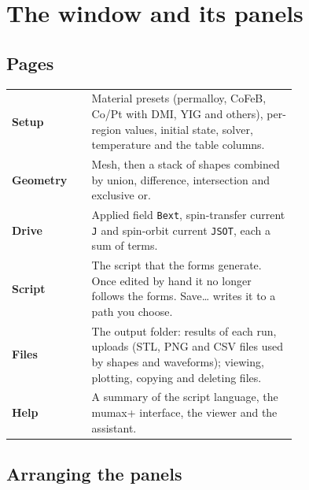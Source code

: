 \documentclass[11pt,a4paper,oneside]{book}
\newcommand{\code}[1]{\texttt{#1}}
\renewcommand{\_}{\textunderscore\allowbreak}
\newcommand{\menu}[1]{\textsf{#1}}
\begin{document}
\chapter{The window and its panels}\label{ch:ui}

\section{Pages}

\begin{center}
\begin{tabular}{>{\bfseries}l p{0.72\linewidth}}
\toprule
Setup & Material presets (permalloy, CoFeB, Co/Pt with DMI, YIG and others), per-region values, initial state,
solver, temperature and the table columns. \\
Geometry & Mesh, then a stack of shapes combined by union, difference, intersection and exclusive or. \\
Drive & Applied field \code{B\_ext}, spin-transfer current \code{J} and spin-orbit current \code{JSOT}, each a sum of
terms. \\
Script & The script that the forms generate. Once edited by hand it no longer follows the forms.
\menu{Save\ldots} writes it to a path you choose. \\
Files & The output folder: results of each run, uploads (STL, PNG and CSV files used by shapes and waveforms);
viewing, plotting, copying and deleting files. \\
Help & A summary of the script language, the mumax+ interface, the viewer and the assistant. \\
\bottomrule
\end{tabular}
\end{center}

\section{Arranging the panels}
\end{document}
